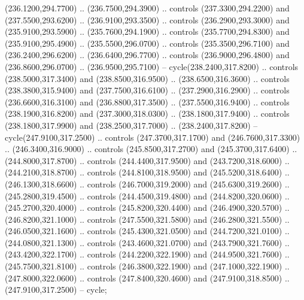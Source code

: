 {\begin{scope}[y=0.80pt, x=0.80pt, yscale=-1, xscale=1, inner sep=0pt, outer sep=0pt, #1]
      (236.1200,294.7700) .. (236.7500,294.3900) .. controls (237.3300,294.2200) and
      (237.5500,293.6200) .. (236.9100,293.3500) .. controls (236.2900,293.3000) and
      (235.9100,293.5900) .. (235.7600,294.1900) .. controls (235.7700,294.8300) and
      (235.9100,295.4900) .. (235.5500,296.0700) .. controls (235.3500,296.7100) and
      (236.2400,296.6200) .. (236.6400,296.7700) .. controls (236.9000,296.4800) and
      (236.8600,296.0700) .. (236.9500,295.7100) -- cycle(238.2400,317.8200) ..
      controls (238.5000,317.3400) and (238.8500,316.9500) .. (238.6500,316.3600) ..
      controls (238.3800,315.9400) and (237.7500,316.6100) .. (237.2900,316.2900) ..
      controls (236.6600,316.3100) and (236.8800,317.3500) .. (237.5500,316.9400) ..
      controls (238.1900,316.8200) and (237.3000,318.0300) .. (238.1800,317.9400) ..
      controls (238.1800,317.9900) and (238.2500,317.7000) .. (238.2400,317.8200) --
      cycle(247.9100,317.2500) .. controls (247.3700,317.1700) and
      (246.7600,317.3300) .. (246.3400,316.9000) .. controls (245.8500,317.2700) and
      (245.3700,317.6400) .. (244.8000,317.8700) .. controls (244.4400,317.9500) and
      (243.7200,318.6000) .. (244.2100,318.8700) .. controls (244.8100,318.9500) and
      (245.5200,318.6400) .. (246.1300,318.6600) .. controls (246.7000,319.2000) and
      (245.6300,319.2600) .. (245.2800,319.4500) .. controls (244.4500,319.4800) and
      (244.8200,320.0600) .. (245.2700,320.4000) .. controls (245.8200,320.4400) and
      (246.4900,320.5700) .. (246.8200,321.1000) .. controls (247.5500,321.5800) and
      (246.2800,321.5500) .. (246.0500,321.1600) .. controls (245.4300,321.0500) and
      (244.7200,321.0100) .. (244.0800,321.1300) .. controls (243.4600,321.0700) and
      (243.7900,321.7600) .. (243.4200,322.1700) .. controls (244.2200,322.1900) and
      (244.9500,321.7600) .. (245.7500,321.8100) .. controls (246.3800,322.1900) and
      (247.1000,322.1900) .. (247.8000,322.0600) .. controls (247.8400,320.4600) and
      (247.9100,318.8500) .. (247.9100,317.2500) -- cycle;


\end{scope}}
